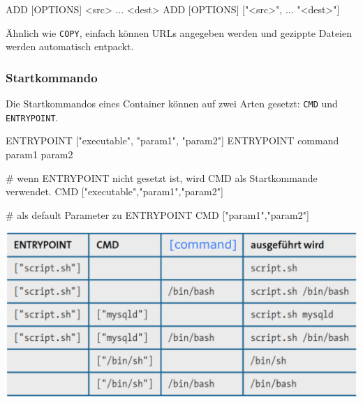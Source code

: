 \documentclass[
  10pt,
  a4paper,
  twocolumn]{article}
\newenvironment{Shaded}{}{}
\newcommand{\BuiltInTok}[1]{\textcolor[rgb]{0.84,0.23,0.29}{#1}}
\newcommand{\CommentTok}[1]{\textcolor[rgb]{0.42,0.45,0.49}{#1}}
\newcommand{\KeywordTok}[1]{\textcolor[rgb]{0.84,0.23,0.29}{#1}}
\newcommand{\NormalTok}[1]{\textcolor[rgb]{0.14,0.16,0.18}{#1}}
\newcommand{\StringTok}[1]{\textcolor[rgb]{0.01,0.18,0.38}{#1}}
\begin{document}
\begin{Shaded}
\begin{Highlighting}[]
\KeywordTok{ADD}\NormalTok{ [OPTIONS] \textless{}src\textgreater{} ... \textless{}dest\textgreater{}}
\KeywordTok{ADD}\NormalTok{ [OPTIONS] [}\StringTok{"\textless{}src\textgreater{}"}\NormalTok{, ... }\StringTok{"\textless{}dest\textgreater{}"}\NormalTok{]}
\end{Highlighting}
\end{Shaded}

Ähnlich wie \texttt{COPY}, einfach können URLs angegeben werden und
gezippte Dateien werden automatisch entpackt.

\subsubsection{Startkommando}\label{startkommando}

Die Startkommandos eines Container können auf zwei Arten gesetzt:
\texttt{CMD} und \texttt{ENTRYPOINT}.

\begin{Shaded}
\begin{Highlighting}[]
\KeywordTok{ENTRYPOINT}\NormalTok{ [}\StringTok{"executable"}\NormalTok{, }\StringTok{"param1"}\NormalTok{, }\StringTok{"param2"}\NormalTok{]}
\KeywordTok{ENTRYPOINT} \BuiltInTok{command}\NormalTok{ param1 param2}
\end{Highlighting}
\end{Shaded}

\begin{Shaded}
\begin{Highlighting}[]
\CommentTok{\# wenn ENTRYPOINT nicht gesetzt ist, wird CMD als Startkommande verwendet.}
\KeywordTok{CMD}\NormalTok{ [}\StringTok{"executable"}\NormalTok{,}\StringTok{"param1"}\NormalTok{,}\StringTok{"param2"}\NormalTok{]}

\CommentTok{\# als default Parameter zu ENTRYPOINT}
\KeywordTok{CMD}\NormalTok{ [}\StringTok{"param1"}\NormalTok{,}\StringTok{"param2"}\NormalTok{]}
\end{Highlighting}
\end{Shaded}

\includegraphics{images/docker/image-1.png}
\end{document}
